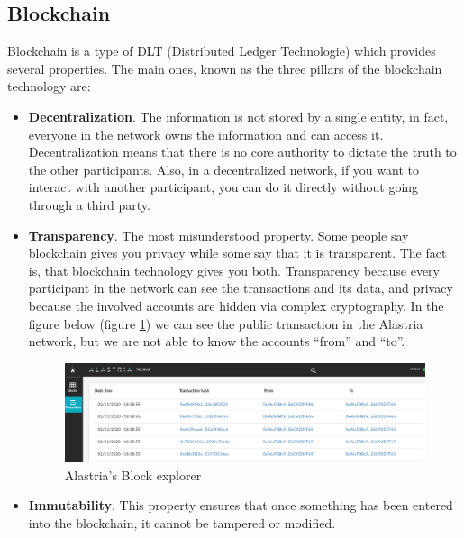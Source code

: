 \documentclass[a4paper, 12pt]{article} %
\begin{document}
    \subsection{Blockchain}
        Blockchain\cite{Bitcoin2015}\cite{blockchain-hype}\cite{blockchain-tech} is a type of DLT (Distributed Ledger Technologie) which provides several properties. The main ones, known as the three pillars of the blockchain technology are:
        \begin{itemize}
            \item \textbf{Decentralization}. The information is not stored by a single entity, in fact, everyone in the network owns the information and can access it. Decentralization means that there is no core authority to dictate the truth to the other participants. Also, in a decentralized network, if you want to interact with another participant, you can do it directly without going through a third party.
            \item \textbf{Transparency}. The most misunderstood property. Some people say blockchain gives you privacy while some say that it is transparent. The fact is, that blockchain technology gives you both. Transparency because every participant in the network can see the transactions and its data, and privacy because the involved accounts are hidden via complex cryptography. In the figure below (figure \ref{fig:alastria_block_explorer}) we can see the public transaction in the Alastria network, but we are not able to know the accounts “from” and “to”.
            \begin{figure}[h]
                \centering
                \includegraphics[width=1.1\textwidth]{Alastria-block-exporer.png}
                \caption{Alastria's Block explorer}
                \label{fig:alastria_block_explorer}
            \end{figure}
            \item \textbf{Immutability}. This property ensures that once something has been entered into the blockchain, it cannot be tampered or modified.
        \end{itemize}
        
\end{document}
